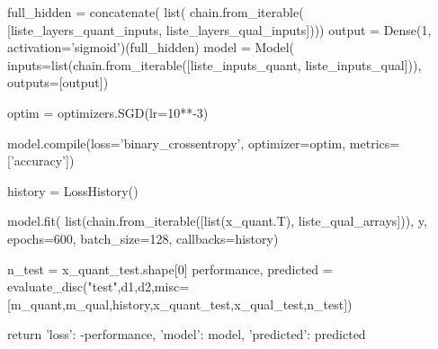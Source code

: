 \begin{pylisting}
    full_hidden = concatenate(
        list(
          chain.from_iterable(
              [liste_layers_quant_inputs, liste_layers_qual_inputs])))
    output = Dense(1, activation='sigmoid')(full_hidden)
    model = Model(
      inputs=list(chain.from_iterable([liste_inputs_quant, liste_inputs_qual])),
      outputs=[output])  

    optim = optimizers.SGD(lr=10**-3)       
 
    model.compile(loss='binary_crossentropy', optimizer=optim, metrics=['accuracy'])

    history = LossHistory()
    
    model.fit(
      list(chain.from_iterable([list(x_quant.T), liste_qual_arrays])),
      y,
      epochs=600,
      batch_size=128,
      callbacks=history)

    n_test = x_quant_test.shape[0]
    performance, predicted = evaluate_disc("test",d1,d2,misc=[m_quant,m_qual,history,x_quant_test,x_qual_test,n_test])
  
    return {'loss': -performance, 'model': model, 'predicted': predicted}

\end{pylisting}
